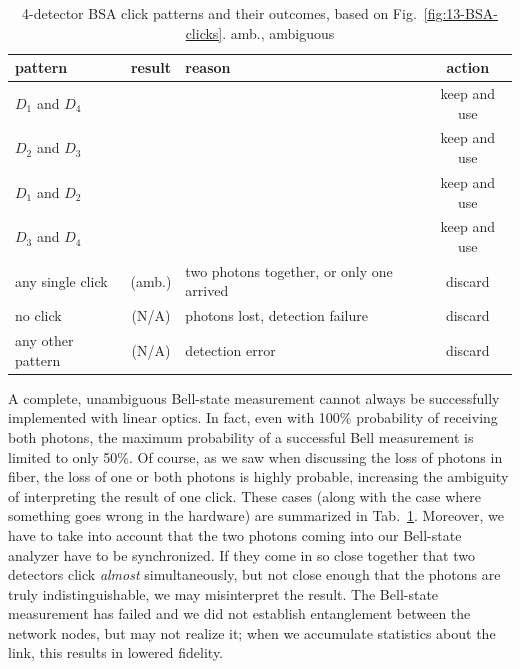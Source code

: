 \begin{table}
\centering
\begin{tabular}{p{0.55in}|c|p{1.5in}|c}
pattern  & result & reason & action \\\hline
$D_1$ and $D_4$ & \ket{\Psi^-} & & keep and use \\
$D_2$ and $D_3$ & \ket{\Psi^-} & & keep and use \\
$D_1$ and $D_2$ & \ket{\Psi^+} & & keep and use \\
$D_3$ and $D_4$ & \ket{\Psi^+} & & keep and use \\
any single click & \ket{\Phi^\pm} (amb.)  & two photons together, or only one arrived & discard \\
no click & (N/A) & photons lost, detection failure & discard \\
any other pattern & (N/A) & detection error & discard
\end{tabular}
\caption{4-detector BSA click patterns and their outcomes, based on Fig.~\ref{fig:13-BSA-clicks}. amb., ambiguous}
\label{tab:bsa-clicks}
\end{table}

A complete, unambiguous Bell-state measurement cannot always be successfully implemented with linear optics. In fact, even with 100\% probability of receiving both photons, the maximum probability of a successful Bell measurement is limited to only 50\%.  Of course, as we saw when discussing the loss of photons in fiber, the loss of one or both photons is highly probable, increasing the ambiguity of interpreting the result of one click.  These cases (along with the case where something goes wrong in the hardware) are summarized in Tab.~\ref{tab:bsa-clicks}. 
Moreover, we have to take into account that the two photons coming into our Bell-state analyzer have to be synchronized. If they come in so close together that two detectors click \emph{almost} simultaneously, but not close enough that the photons are truly indistinguishable, we may misinterpret the result. The Bell-state measurement has failed and we did not establish entanglement between the network nodes, but may not realize it; when we accumulate statistics about the link, this results in lowered fidelity.


